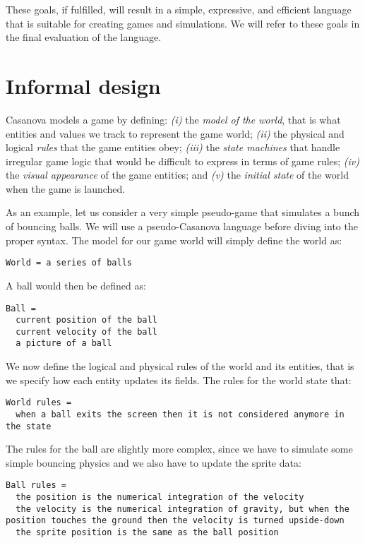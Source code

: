 These goals, if fulfilled, will result in a simple, expressive, and efficient language that is suitable for creating games and simulations. We will refer to these goals in the final evaluation of the language.


\section{Informal design}

Casanova models a game by defining: \textit{(i)} the \textit{model of the world}, that is what entities and values we track to represent the game world; \textit{(ii)} the physical and logical \textit{rules} that the game entities obey; \textit{(iii)} the \textit{state machines} that handle irregular game logic that would be difficult to express in terms of game rules; \textit{(iv)} the \textit{visual appearance} of the game entities; and \textit{(v)} the \textit{initial state} of the world when the game is launched. 

As an example, let us consider a very simple pseudo-game that simulates a bunch of bouncing balls. We will use a pseudo-Casanova language before diving into the proper syntax. The model for our game world will simply define the world as:

\begin{lstlisting}
World = a series of balls
\end{lstlisting}

A ball would then be defined as:

\begin{lstlisting}
Ball = 
  current position of the ball
  current velocity of the ball
  a picture of a ball
\end{lstlisting}

We now define the logical and physical rules of the world and its entities, that is we specify how each entity updates its fields. The rules for the world state that:

\begin{lstlisting}
World rules = 
  when a ball exits the screen then it is not considered anymore in the state
\end{lstlisting}

The rules for the ball are slightly more complex, since we have to simulate some simple bouncing physics and we also have to update the sprite data:

\begin{lstlisting}
Ball rules =
  the position is the numerical integration of the velocity
  the velocity is the numerical integration of gravity, but when the position touches the ground then the velocity is turned upside-down
  the sprite position is the same as the ball position
\end{lstlisting}

